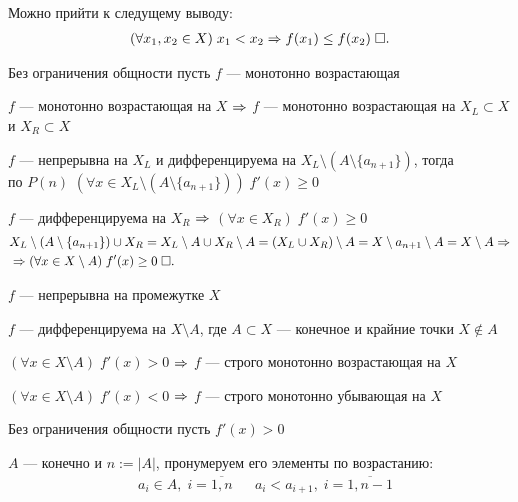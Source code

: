 \documentclass{article}
\begin{document}
\begin{enumerate}
	Можно прийти к следущему выводу:
	\begin{align*}
		(\forall x_1,x_2\in X)\;x_1<x_2\Rightarrow f(x_1)\leq f(x_2)\;\square.
	\end{align*}

	\enough

	Без ограничения общности пусть $f$ --- монотонно возрастающая

	$f$ --- монотонно возрастающая на $X$ $\Rightarrow$ $f$ ---  монотонно возрастающая на $X_{L}\subset X$ и $X_{R}\subset X$

	$f$ --- непрерывна на $X_{L}$ и дифференцируема на $X_{L}\setminus (A\setminus \{a_{n+1}\})$, тогда\\
	по $P(n)$ $(\forall x\in X_{L}\setminus (A\setminus\{a_{n+1}\}))\;f'(x)\geq 0$

	$f$ --- дифференцируема на $X_{R}$ $\Rightarrow$ $(\forall x\in X_{R})\;f'(x)\geq 0$
	\begin{align*}
		 & X_{L}\setminus(A\setminus\{a_{n+1}\})\cup X_{R}=X_{L}\setminus A\cup X_{R}\setminus A=(X_{L}\cup X_{R})\setminus A=X\setminus a_{n+1}\setminus A=X\setminus A\Rightarrow \\
		 & \Rightarrow (\forall x\in X\setminus A)\;f'(x)\geq 0\;\square.
	\end{align*}

\end{enumerate}


\theorem

$f$ --- непрерывна на промежутке $X$

$f$ --- дифференцируема на $X\setminus A$, где $A\subset X$ --- конечное и крайние точки $X\notin A$

$(\forall x\in X\setminus A)\;f'(x)>0$ $\Rightarrow$ $f$ --- строго монотонно возрастающая на $X$

$(\forall x\in X\setminus A)\;f'(x)<0$ $\Rightarrow$ $f$ --- строго монотонно убывающая на $X$

\proof

Без ограничения общности пусть $f'(x)>0$

$A$ --- конечно и $n:=|A|$, пронумеруем его элементы по возрастанию:
\begin{align*}
	 & a_{i}\in A,\;i=\overline{1,n} &  & a_{i}<a_{i+1},\;i=\overline{1,n-1}
\end{align*}
\end{document}
